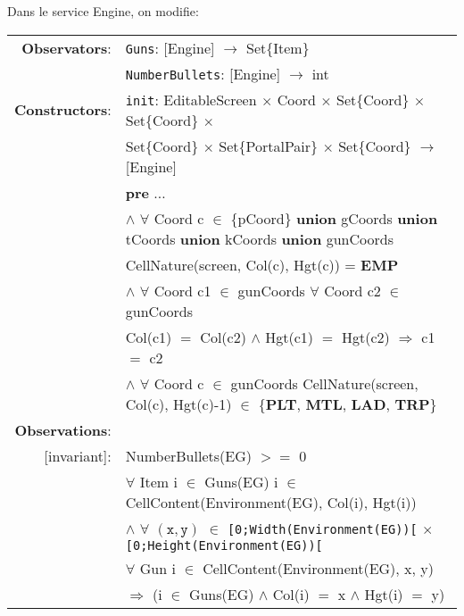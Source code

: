 \documentclass[8pt]{article}
\begin{document}
Dans le service \textrm{Engine}, on modifie:
{\small
  \begin{longtable}{rl}
    \textbf{Observators}: & \texttt{Guns}: \textrm{[Engine]} $\rightarrow$ \textrm{Set\{Item\}} \\
    & \texttt{NumberBullets}: \textrm{[Engine]} $\rightarrow$ \textrm{int} \\

    \textbf{Constructors}: & \texttt{init}: \textrm{EditableScreen} $\times$ \textrm{Coord} $\times$ \textrm{Set\{Coord\}} $\times$ \textrm{Set\{Coord\}} $\times$\\
    & \quad\quad\quad \textrm{Set\{Coord\}} $\times$ \textrm{Set\{PortalPair\}} $\times$ \textrm{Set\{Coord\}} $\rightarrow$ \textrm{[Engine]} \\
    & \quad \textbf{pre} $\ldots$\\
    & \quad\quad $\land$ $\forall$ \textrm{Coord} c $\in$ \{pCoord\} \textbf{union} gCoords \textbf{union} tCoords \textbf{union} kCoords \textbf{union} gunCoords\\
    & \quad\quad\quad\quad\quad \textrm{CellNature(screen, Col(c), Hgt(c))} = \textbf{EMP} \\
    & \quad\quad $\land$ $\forall$ \textrm{Coord} c1 $\in$ gunCoords $\forall$ \textrm{Coord} c2 $\in$ gunCoords\\
    & \quad\quad\quad\quad\quad \textrm{Col(c1)} $=$ \textrm{Col(c2)} $\land$ \textrm{Hgt(c1)} $=$ \textrm{Hgt(c2)} $\Rightarrow$ c1 $=$ c2\\
    & \quad\quad $\land$ $\forall$ \textrm{Coord} c $\in$ gunCoords \textrm{CellNature(screen, Col(c), Hgt(c)-1)} $\in$ \{\textbf{PLT}, \textbf{MTL}, \textbf{LAD}, \textbf{TRP}\} \\

    \textbf{Observations}:&\\
    \textrm{[invariant]}: & \textrm{NumberBullets(EG)} $>=$ 0\\
    & $\forall$ \textrm{Item} i $\in$ \textrm{Guns(EG)} i $\in$ \textrm{CellContent(Environment(EG), Col(i), Hgt(i))}\\
    & \quad\quad $\land$ $\forall$ $(\mathtt{x},\mathtt{y})$ $\in$ \texttt{[0;Width(Environment(EG))[} $\times$ \texttt{[0;Height(Environment(EG))[}\\
    & \quad\quad\quad\quad $\forall$ \textrm{Gun} i $\in$ \textrm{CellContent(Environment(EG), x, y)} \\
    & \quad\quad\quad\quad\quad\quad $\Rightarrow$ (i $\in$ \textrm{Guns(EG)} $\land$ \textrm{Col(i)} $=$ x $\land$ \textrm{Hgt(i)} $=$ y)\\


\end{longtable}}
\end{document}

